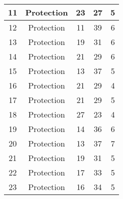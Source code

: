 \documentclass[results.tex]{subfiles}
\begin{document}
\begin{center}
\begin{tabular}{| c || c | c | c | c |}
            \hline
            11                      & Protection                   & 23                     & 27                      & 5                    \\
            \hline
            12                      & Protection                   & 11                     & 39                      & 6                    \\
            \hline
            13                      & Protection                   & 19                     & 31                      & 6                    \\
            \hline
            14                      & Protection                   & 21                     & 29                      & 6                    \\
            \hline
            15                      & Protection                   & 13                     & 37                      & 5                    \\
            \hline
            16                      & Protection                   & 21                     & 29                      & 4                    \\
            \hline
            17                      & Protection                   & 21                     & 29                      & 5                    \\
            \hline
            18                      & Protection                   & 27                     & 23                      & 4                    \\
            \hline
            19                      & Protection                   & 14                     & 36                      & 6                    \\
            \hline
            20                      & Protection                   & 13                     & 37                      & 7                    \\
            \hline
            21                      & Protection                   & 19                     & 31                      & 5                    \\
            \hline
            22                      & Protection                   & 17                     & 33                      & 5                    \\
            \hline
            23                      & Protection                   & 16                     & 34                      & 5                    \\

\end{tabular}
\end{center}
\end{document}
